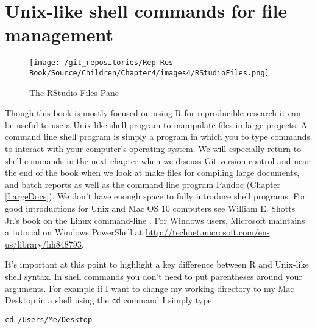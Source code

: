 \section{Unix-like shell commands for file management} 

\begin{wrapfigure}{r}{0.5\textwidth}
    \caption{The RStudio Files Pane} %
    \label{FilesPane}
        \begin{center}    
        \texttt{[image: /git\_repositories/Rep-Res-Book/Source/Children/Chapter4/images4/RStudioFiles.png]}
        \end{center}
\end{wrapfigure}

Though this book is mostly focused on using R for reproducible research it can be useful to use a Unix-like shell program to manipulate files in large projects. A command line shell program is simply a program in which you to type commands to interact with your computer's operating system. We will especially return to shell commands in the next chapter when we discuss Git version control and near the end of the book when we look at make files for compiling large documents, and batch reports as well as the command line program Pandoc (Chapter \ref{LargeDocs}). We don't have enough space to fully introduce shell programs. For good introductions for Unix and Mac OS 10 computers see William E. Shotts Jr.'s book on the Linux command-line \cite[]{ShottsJr2012}. For Windows users, Microsoft maintains a tutorial on Windows PowerShell at \url{http://technet.microsoft.com/en-us/library/hh848793}.

It's important at this point to highlight a key difference between R and Unix-like shell syntax. In shell commands you don't need to put parentheses around your arguments. For example if I want to change my working directory to my Mac Desktop in a shell using the \texttt{cd} command I simply type:

\begin{knitrout}
\color{fgcolor}\begin{kframe}
\begin{verbatim}
cd /Users/Me/Desktop
\end{verbatim}
\end{kframe}
\end{knitrout}



